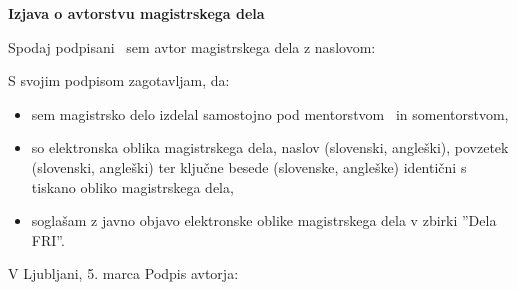 \vspace*{1cm}
\begin{center}
{\Large \textbf{\sc Izjava o avtorstvu magistrskega dela}}
\end{center}

\vspace{1cm}
\noindent Spodaj podpisani \tauthor\ sem avtor magistrskega dela z naslovom:

\vspace{0.5cm}
\begin{center}
\emph{\ttitle}
\end{center}

\vspace{1cm}
\noindent S svojim podpisom zagotavljam, da:
\begin{itemize}
	\item sem magistrsko delo izdelal samostojno pod mentorstvom \mysupervisor\ in somentorstvom,

	\item so elektronska oblika magistrskega dela, naslov (slovenski, angleški), povzetek (slovenski, angleški) ter ključne besede (slovenske, angleške) identični s tiskano obliko magistrskega dela,
	\item soglašam z javno objavo elektronske oblike magistrskega dela v zbirki ''Dela FRI''.
\end{itemize}

\vspace{1cm}
\noindent V Ljubljani, 5. marca \myyear \hfill Podpis avtorja: